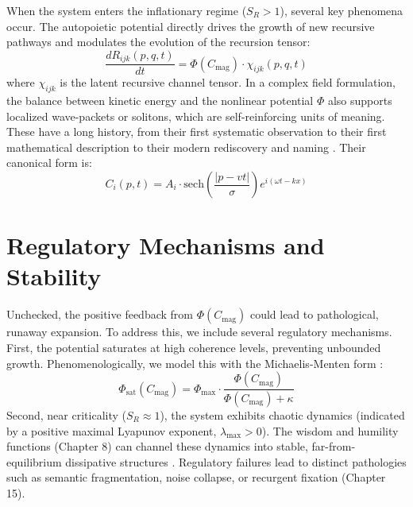 When the system enters the inflationary regime (\(S_R > 1\)), several key phenomena occur. The autopoietic potential directly drives the growth of new recursive pathways and modulates the evolution of the recursion tensor:
\begin{equation}
\frac{dR_{ijk}(p,q,t)}{dt} = \Phi(C_{\mathrm{mag}}) \cdot \chi_{ijk}(p,q,t)
\end{equation}
where \(\chi_{ijk}\) is the latent recursive channel tensor. In a complex field formulation, the balance between kinetic energy and the nonlinear potential \(\Phi\) also supports localized wave-packets or solitons, which are self-reinforcing units of meaning. These have a long history, from their first systematic observation \autocite{Russell1845} to their first mathematical description \autocite{KortewegdeVries1895} to their modern rediscovery and naming \autocite{ZabuskyKruskal1965}. Their canonical form is:
\begin{equation}
C_i(p,t) = A_i \cdot \text{sech}\left(\frac{|p-vt|}{\sigma}\right) e^{i(\omega t - kx)}
\end{equation}


\section{Regulatory Mechanisms and Stability}
\label{sec:regulatory_mechanisms_and_stability}

Unchecked, the positive feedback from \(\Phi(C_{\mathrm{mag}})\) could lead to pathological, runaway expansion. To address this, we include several regulatory mechanisms. First, the potential saturates at high coherence levels, preventing unbounded growth. Phenomenologically, we model this with the Michaelis-Menten form \autocite{MichaelisMenten1913}:
\begin{equation}
\Phi_{\text{sat}}(C_{\mathrm{mag}}) = \Phi_{\text{max}} \cdot \frac{\Phi(C_{\mathrm{mag}})}{\Phi(C_{\mathrm{mag}}) + \kappa}
\end{equation}
Second, near criticality (\(S_R \approx 1\)), the system exhibits chaotic dynamics (indicated by a positive maximal Lyapunov exponent, \(\lambda_{\text{max}} > 0\)). The wisdom and humility functions (Chapter 8) can channel these dynamics into stable, far-from-equilibrium dissipative structures \autocite{PrigogineStengers1984}. Regulatory failures lead to distinct pathologies such as semantic fragmentation, noise collapse, or recurgent fixation (Chapter 15).

